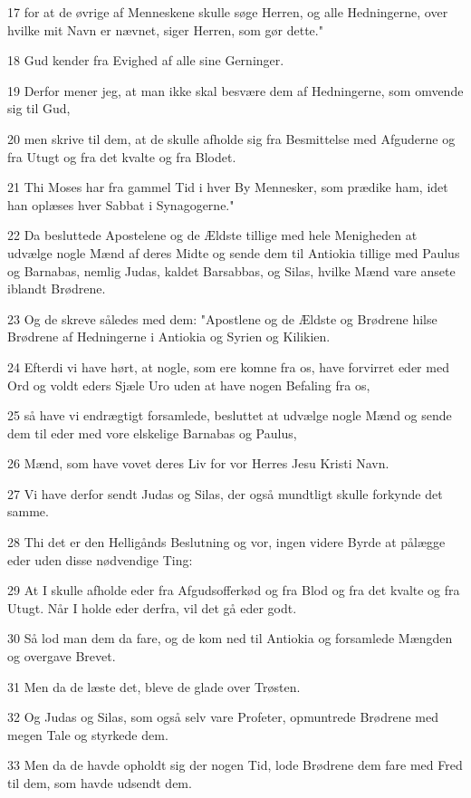 \par 17 for at de øvrige af Menneskene skulle søge Herren, og alle Hedningerne, over hvilke mit Navn er nævnet, siger Herren, som gør dette."
\par 18 Gud kender fra Evighed af alle sine Gerninger.
\par 19 Derfor mener jeg, at man ikke skal besvære dem af Hedningerne, som omvende sig til Gud,
\par 20 men skrive til dem, at de skulle afholde sig fra Besmittelse med Afguderne og fra Utugt og fra det kvalte og fra Blodet.
\par 21 Thi Moses har fra gammel Tid i hver By Mennesker, som prædike ham, idet han oplæses hver Sabbat i Synagogerne."
\par 22 Da besluttede Apostelene og de Ældste tillige med hele Menigheden at udvælge nogle Mænd af deres Midte og sende dem til Antiokia tillige med Paulus og Barnabas, nemlig Judas, kaldet Barsabbas, og Silas, hvilke Mænd vare ansete iblandt Brødrene.
\par 23 Og de skreve således med dem: "Apostlene og de Ældste og Brødrene hilse Brødrene af Hedningerne i Antiokia og Syrien og Kilikien.
\par 24 Efterdi vi have hørt, at nogle, som ere komne fra os, have forvirret eder med Ord og voldt eders Sjæle Uro uden at have nogen Befaling fra os,
\par 25 så have vi endrægtigt forsamlede, besluttet at udvælge nogle Mænd og sende dem til eder med vore elskelige Barnabas og Paulus,
\par 26 Mænd, som have vovet deres Liv for vor Herres Jesu Kristi Navn.
\par 27 Vi have derfor sendt Judas og Silas, der også mundtligt skulle forkynde det samme.
\par 28 Thi det er den Helligånds Beslutning og vor, ingen videre Byrde at pålægge eder uden disse nødvendige Ting:
\par 29 At I skulle afholde eder fra Afgudsofferkød og fra Blod og fra det kvalte og fra Utugt. Når I holde eder derfra, vil det gå eder godt.
\par 30 Så lod man dem da fare, og de kom ned til Antiokia og forsamlede Mængden og overgave Brevet.
\par 31 Men da de læste det, bleve de glade over Trøsten.
\par 32 Og Judas og Silas, som også selv vare Profeter, opmuntrede Brødrene med megen Tale og styrkede dem.
\par 33 Men da de havde opholdt sig der nogen Tid, lode Brødrene dem fare med Fred til dem, som havde udsendt dem.
